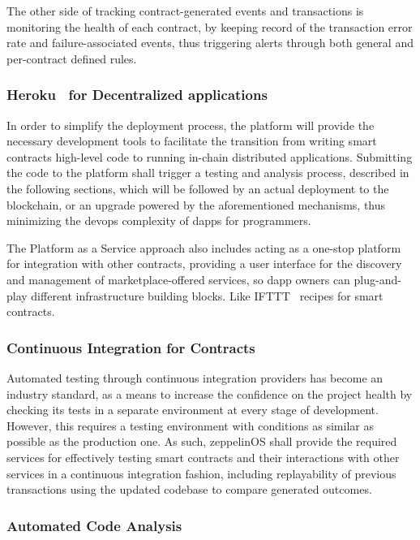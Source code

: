 \documentclass[]{article}
\makeatletter
\DeclareRobustCommand{\_}{%
  \leavevmode\vbox{%
    \hrule\@width.5em
          \@height-.26ex
          \@depth\dimexpr.26ex+.28pt\relax}}
\makeatother
\begin{document}
The other side of tracking contract-generated events and transactions
is monitoring the health of each contract, by keeping record of the
transaction error rate and failure-associated events, thus triggering
alerts through both general and per-contract defined rules.

\subsubsection{Heroku~\cite{heroku} for Decentralized applications}

In order to simplify the deployment process, the platform will provide
the necessary development tools to facilitate the transition from
writing smart contracts high-level code to running in-chain distributed
applications. Submitting the code to the platform shall trigger a
testing and analysis process, described in the following sections, which
will be followed by an actual deployment to the blockchain, or an
upgrade powered by the aforementioned mechanisms, thus minimizing the
devops complexity of dapps for programmers.

The Platform as a Service approach also includes acting as a one-stop
platform for integration with other contracts, providing a user
interface for the discovery and management of marketplace-offered
services, so dapp owners can plug-and-play different infrastructure
building blocks. Like IFTTT~\cite{ifttt} recipes for smart contracts.

\subsubsection{Continuous Integration for Contracts}

Automated testing through continuous integration providers has become an
industry standard, as a means to increase the confidence on the project health
by checking its tests in a separate environment at every stage of development.
However, this requires a testing environment with conditions as similar as
possible as the production one. As such, zeppelinOS shall provide the required
services for effectively testing smart contracts and their interactions with
other services in a continuous integration fashion, including replayability of
previous transactions using the updated codebase to compare generated outcomes.

\subsubsection{Automated Code Analysis}
\end{document}
